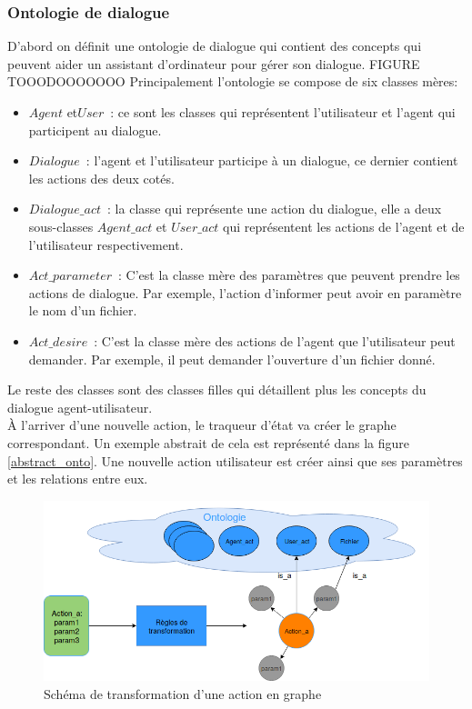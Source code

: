 		\subsubsection{Ontologie de dialogue}
		D’abord on définit une ontologie de dialogue qui contient des concepts qui peuvent aider un assistant d’ordinateur pour gérer son dialogue.
		FIGURE TOOODOOOOOOO
		Principalement l’ontologie se compose de six classes mères:
		\begin{itemize}
			\item $Agent$ et$ User$ : ce sont les classes qui représentent l’utilisateur et l’agent qui participent au dialogue.
			\item $Dialogue$ : l’agent et l’utilisateur participe à un dialogue, ce dernier contient les actions des deux cotés.
			\item $Dialogue\_act$ : la classe qui représente une action du dialogue, elle a deux sous-classes $Agent\_act$ et $User\_act$ qui représentent les actions de l’agent et de l’utilisateur respectivement.
			\item $Act\_parameter$ : C’est la classe mère des paramètres que peuvent prendre les actions de dialogue. Par exemple, l’action d’informer peut avoir en paramètre le nom d’un fichier.
			\item $Act\_desire$ : C’est la classe mère des actions de l’agent que l’utilisateur peut demander. Par exemple, il peut demander l’ouverture d’un fichier donné.
		\end{itemize}
	Le reste des classes sont des classes filles qui détaillent plus les concepts du dialogue agent-utilisateur.\\
	À l’arriver d’une nouvelle action, le traqueur d’état va créer le graphe correspondant. Un exemple abstrait de cela est représenté dans la figure \ref{abstract_onto}. Une nouvelle action utilisateur est créer ainsi que ses paramètres et les relations entre eux.
	\begin{figure}[H] 
		\centering
		\includegraphics[width=0.88\linewidth]{images/Conception/DM/abstract_onto.png}
		\caption{Schéma de transformation d'une action en graphe}
		
	\end{figure}\label{abstract_onto}
